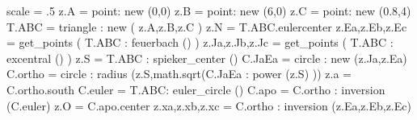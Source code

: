\begin{tkzelements}
   scale             = .5
   z.A               = point: new (0,0)
   z.B               = point: new (6,0)
   z.C               = point: new (0.8,4)
   T.ABC             = triangle : new ( z.A,z.B,z.C )
   z.N               = T.ABC.eulercenter
   z.Ea,z.Eb,z.Ec    = get_points ( T.ABC : feuerbach () )
   z.Ja,z.Jb,z.Jc    = get_points ( T.ABC : excentral () )
   z.S               = T.ABC : spieker_center ()
   C.JaEa            = circle : new (z.Ja,z.Ea)
   C.ortho           = circle : radius (z.S,math.sqrt(C.JaEa : power (z.S) ))
   z.a               = C.ortho.south
   C.euler           = T.ABC: euler_circle ()
   C.apo             = C.ortho : inversion (C.euler)
   z.O               = C.apo.center
   z.xa,z.xb,z.xc    = C.ortho : inversion (z.Ea,z.Eb,z.Ec)
\end{tkzelements}

\begin{center}
\end{center}



